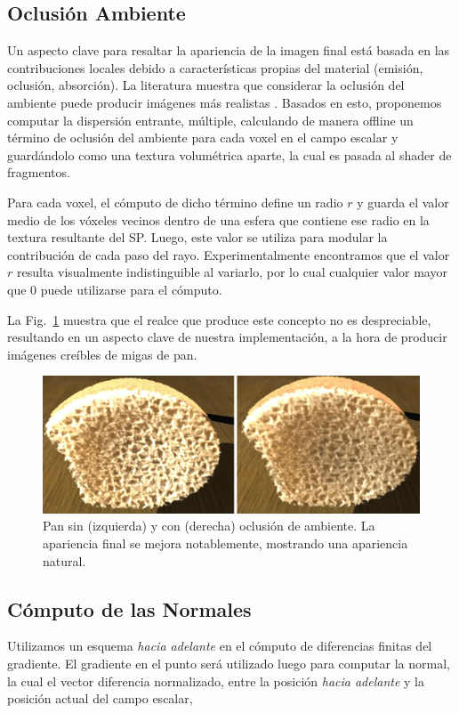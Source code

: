 \subsection{Oclusión Ambiente}

Un aspecto clave para resaltar la apariencia de la imagen final está basada en las contribuciones locales debido a características propias del material (emisión, oclusión, absorción).
La literatura muestra que considerar la oclusión del ambiente puede producir imágenes más realistas \cite{Hernell2010}.
Basados en esto, proponemos computar la dispersión entrante, múltiple, calculando de manera offline un término de oclusión del ambiente para cada voxel en el campo escalar y guardándolo como una textura volumétrica aparte, la cual es pasada al shader de fragmentos.

Para cada voxel, el cómputo de dicho término define un radio $r$ y guarda el valor medio de los vóxeles vecinos dentro de una esfera que contiene ese radio en la textura resultante del SP.
Luego, este valor se utiliza para modular la contribución de cada paso del rayo.
Experimentalmente encontramos que el valor $r$ resulta visualmente indistinguible al variarlo, por lo cual cualquier valor mayor que $0$ puede utilizarse para el cómputo.

La Fig.~\ref{fg:occlusion} muestra que el realce que produce este concepto no es despreciable, resultando en un aspecto clave de nuestra implementación, a la hora de producir imágenes creíbles de migas de pan. 



\begin{figure}
\centerline{\includegraphics[width=13cm]{figures/occlusion}}
  \caption{Pan sin (izquierda) y con (derecha) oclusión de ambiente. La apariencia final se mejora notablemente, mostrando una apariencia natural.}
  \label{fg:occlusion}
\end{figure}
 
\subsection{Cómputo de las Normales}
Utilizamos un esquema {\em hacia adelante} en el cómputo de diferencias finitas del gradiente.
El gradiente en el punto será utilizado luego para computar la normal, la cual el vector diferencia normalizado, entre la posición {\em hacia adelante} y la posición actual del campo escalar,


